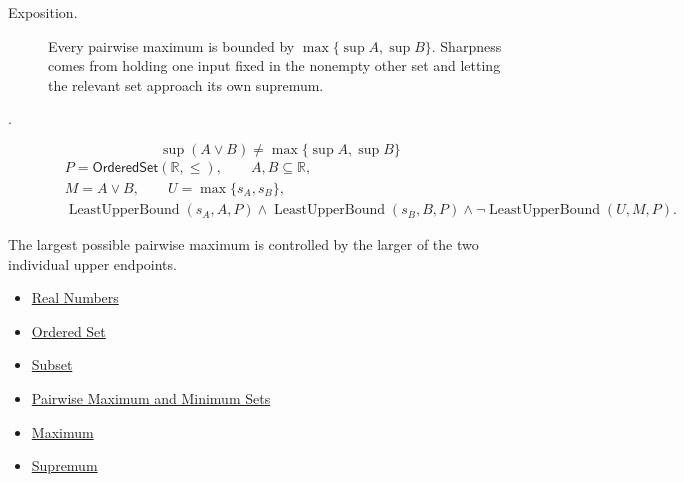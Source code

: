 \begin{remark*}
\begin{description}
\item[Exposition.]
Every pairwise maximum is bounded by $\max\{\sup A,\sup B\}$.  Sharpness comes
from holding one input fixed in the nonempty other set and letting the relevant
set approach its own supremum.


  \item[.]
  \[
\sup(A\vee B)\neq\max\{\sup A,\sup B\}
\]
\[
\begin{aligned}
&P=\mathsf{OrderedSet}(\mathbb{R},\leq),\qquad A,B\subseteq\mathbb{R},\\
&M=A\vee B,\qquad U=\max\{s_A,s_B\},\\
&\operatorname{LeastUpperBound}(s_A,A,P)\land\operatorname{LeastUpperBound}(s_B,B,P)\land
\neg\operatorname{LeastUpperBound}(U,M,P).
\end{aligned}
\]
\end{description}
\end{remark*}

\begin{remark*}[Interpretation]
The largest possible pairwise maximum is controlled by the larger of the two
individual upper endpoints.
\end{remark*}

\begin{dependencies}
\begin{itemize}
  \item \hyperref[def:reals]{Real Numbers}
  \item \hyperref[def:ordered-set]{Ordered Set}
  \item \hyperref[def:subset]{Subset}
  \item \hyperref[def:pairwise-maximum-minimum-sets]{Pairwise Maximum and Minimum Sets}
  \item \hyperref[def:maximum]{Maximum}
  \item \hyperref[def:supremum]{Supremum}
\end{itemize}
\end{dependencies}


